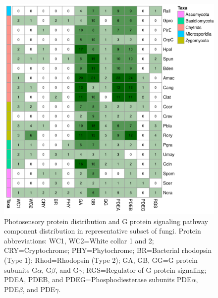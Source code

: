 
\begin{figure}[hb]
  \includegraphics[]{./Chapter_RhodAux/img/photosenseHeatmap.png}
  \caption[Photosensory survey]{Photosensory protein distribution and G protein signaling pathway component distribution in representative subset of fungi. Protein abbreviations: WC1, WC2=White collar 1 and 2; CRY=Cryptochrome; PHY=Phytochrome; BR=Bacterial rhodopsin (Type 1); Rhod=Rhodopsin (Type 2); GA, GB, GG=G protein subunits G$\alpha$, G$\beta$, and G$\gamma$; RGS=Regulator of G protein signaling; PDEA, PDEB, and PDEG=Phosphodiesterase subunits PDE$\alpha$, PDE$\beta$, and PDE$\gamma$.}
  \label{fig:ChRhodA_photosenseSurvey}
\end{figure}

